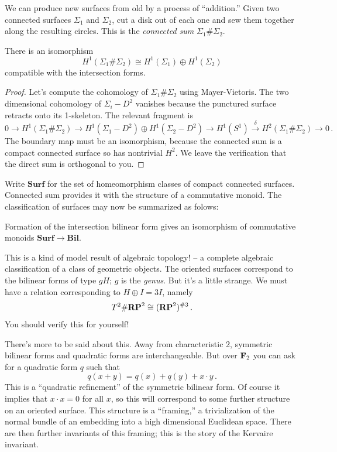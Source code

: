 We can produce new surfaces from old by a process of ``addition.''
Given two connected surfaces $\Sigma_1$ and $\Sigma_2$, 
cut a disk out of each one and
sew them together along the resulting circles. This is the 
{\em connected sum} $\Sigma_1\#\Sigma_2$. 
\begin{prop} 
There is an isomorphism 
\[
H^1(\Sigma_1\#\Sigma_2)\cong H^1(\Sigma_1)\oplus H^1(\Sigma_2)
\]
compatible with the intersection forms. 
\end{prop}
\begin{proof}
Let's compute the cohomology of $\Sigma_1\#\Sigma_2$ using Mayer-Vietoris. 
The two dimensional cohomology of $\Sigma_i-D^2$ vanishes because the 
punctured surface retracts onto its 1-skeleton. The relevant fragment is
\[
0\to H^1(\Sigma_1\#\Sigma_2)\to H^1(\Sigma_1-D^2)\oplus H^1(\Sigma_2-D^2)\to
H^1(S^1)\xrightarrow{\delta} H^2(\Sigma_1\#\Sigma_2)\to0\,.
\]
The boundary map must be an isomorphism, because the connected sum is a
compact connected surface so has nontrivial $H^2$. We leave the verification
that the direct sum is orthogonal to you.
\end{proof} 
Write $\mathbf{Surf}$ for the set of homeomorphism classes of compact connected surfaces. Connected sum provides it with the structure of a commutative monoid. The classification of surfaces may now be summarized as folows:
\begin{theorem}
Formation of the intersection bilinear form gives an isomorphism of 
commutative monoids $\mathbf{Surf}\to\mathbf{Bil}$.
\end{theorem}
This is a kind of model result of algebraic topology! -- a complete
algebraic classification of a class of geometric objects. The oriented
surfaces correspond to the bilinear forms of type $gH$; $g$ is the
{\em genus}. But it's a little
strange. We must have a relation corresponding to $H\oplus I=3I$, namely
\[
T^2\#\mathbf{RP}^2\cong(\mathbf{RP}^2)^{\# 3}\,.
\]
You should verify this for yourself!

There's more to be said about this. Away from characteristic 2, symmetric
bilinear forms
and quadratic forms are interchangeable. But over $\mathbf F_2$ you can ask for
a quadratic form $q$ such that 
\[
q(x+y)=q(x)+q(y)+x\cdot y\,.
\]
This is a ``quadratic refinement'' of the symmetric bilinear form.
Of course it implies that $x\cdot x=0$ for all $x$, so this will
correspond to some further structure on an oriented surface. This 
structure is a ``framing,'' a trivialization of the normal bundle of
an embedding into a high dimensional Euclidean space. There are then
further invariants of this framing; this is the story of the Kervaire
invariant.


